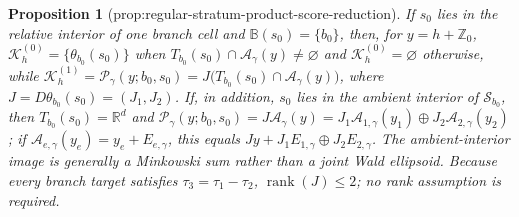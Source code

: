 \documentclass{article}
\newtheorem{proposition}{Proposition}
\begin{document}
\begin{proposition}[prop:regular-stratum-product-score-reduction]\label{prop:regular-stratum-product-score-reduction}
If \(s_0\) lies in the relative interior of one branch cell and \(\mathbb B(s_0)=\{b_0\}\), then, for \(y=h+\mathbb Z_0\), \(\mathcal K_h^{(0)}=\{\theta_{b_0}(s_0)\}\) when \(T_{b_0}(s_0)\cap\mathcal A_{\gamma}(y)\neq\varnothing\) and \(\mathcal K_h^{(0)}=\varnothing\) otherwise, while \(\mathcal K_h^{(1)}=\mathcal P_{\gamma}(y;b_0,s_0)=J\bigl(T_{b_0}(s_0)\cap\mathcal A_{\gamma}(y)\bigr)\), where \(J=D\theta_{b_0}(s_0)=(J_1,J_2)\). If, in addition, \(s_0\) lies in the ambient interior of \(\mathcal S_{b_0}\), then \(T_{b_0}(s_0)=\mathbb R^d\) and \(\mathcal P_{\gamma}(y;b_0,s_0)=J\mathcal A_{\gamma}(y)=J_1\mathcal A_{1,\gamma}(y_1)\oplus J_2\mathcal A_{2,\gamma}(y_2)\); if \(\mathcal A_{e,\gamma}(y_e)=y_e+E_{e,\gamma}\), this equals \(Jy+J_1E_{1,\gamma}\oplus J_2E_{2,\gamma}\). The ambient-interior image is generally a Minkowski sum rather than a joint Wald ellipsoid. Because every branch target satisfies \(\tau_3=\tau_1-\tau_2\), \(\operatorname{rank}(J)\le2\); no rank assumption is required.
\end{proposition}
\end{document}
